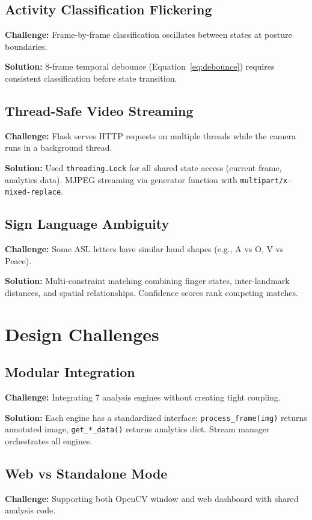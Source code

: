 \documentclass[a4paper,12pt]{report}
\begin{document}
\subsection{Activity Classification Flickering}
\textbf{Challenge:} Frame-by-frame classification oscillates between states at posture boundaries.

\textbf{Solution:} 8-frame temporal debounce (Equation~\ref{eq:debounce}) requires consistent classification before state transition.

\subsection{Thread-Safe Video Streaming}
\textbf{Challenge:} Flask serves HTTP requests on multiple threads while the camera runs in a background thread.

\textbf{Solution:} Used \texttt{threading.Lock} for all shared state access (current frame, analytics data). MJPEG streaming via generator function with \texttt{multipart/x-mixed-replace}.

\subsection{Sign Language Ambiguity}
\textbf{Challenge:} Some ASL letters have similar hand shapes (e.g., A vs O, V vs Peace).

\textbf{Solution:} Multi-constraint matching combining finger states, inter-landmark distances, and spatial relationships. Confidence scores rank competing matches.

\section{Design Challenges}

\subsection{Modular Integration}
\textbf{Challenge:} Integrating 7 analysis engines without creating tight coupling.

\textbf{Solution:} Each engine has a standardized interface: \texttt{process\_frame(img)} returns annotated image, \texttt{get\_*\_data()} returns analytics dict. Stream manager orchestrates all engines.

\subsection{Web vs Standalone Mode}
\textbf{Challenge:} Supporting both OpenCV window and web dashboard with shared analysis code.
\end{document}
